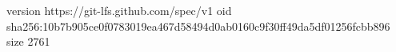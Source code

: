 version https://git-lfs.github.com/spec/v1
oid sha256:10b7b905ce0f0783019ea467d58494d0ab0160c9f30ff49da5df01256fcbb896
size 2761
